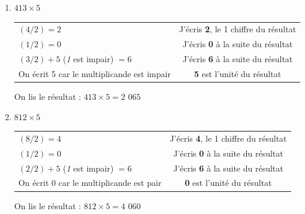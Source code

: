 \documentclass[a4paper, twoside]{article}
\begin{document}
		\begin{small}
		\begin{enumerate}

			\item $413 \times 5$

			\begin{tabular}{l|c}
			
				$(4 / 2) = 2$ & J'écris \textbf{2}, le 1\up{er} chiffre du résultat
				
				\tabularnewline
				
				$(1 / 2) = 0$ & J'écris \textbf{0} à la suite du résultat
				
				\tabularnewline
				
				$(3 / 2) + 5$ (\textit{1} est impair) $= 6$ & J'écris \textbf{6} à la suite du résultat
				
				\tabularnewline
				
				On écrit 5 car le multiplicande est impair & \textbf{5} est l'unité du résultat
				
			\end{tabular}
			
			On lis le résultat : {\boldmath $413 \times 5 = 2$ $065$}\\





			\item $812 \times 5$
			
			\begin{tabular}{l|c}

				$(8 / 2) = 4$ & J'écris \textbf{4}, le 1\up{er} chiffre du résultat
				
				\tabularnewline
				
				$(1 / 2) = 0$ & J'écris \textbf{0} à la suite du résultat
				
				\tabularnewline
				
				$(2 / 2) + 5$ (\textit{1} est impair) $= 6$ & J'écris \textbf{6} à la suite du résultat
				
				\tabularnewline
				
				On écrit 0 car le multiplicande est pair & \textbf{0} est l'unité du résultat
				
			\end{tabular}
			
			On lis le résultat : {\boldmath $812 \times 5 = 4$ $060$}\\
			


			
				

\end{enumerate}
\end{small}
\end{document}
